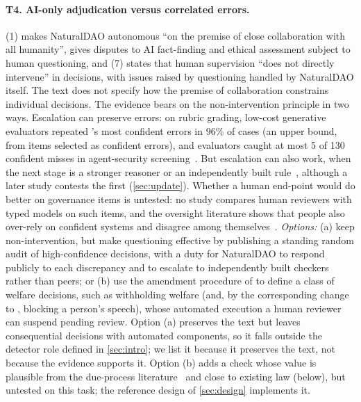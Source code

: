 \paragraph{T4. AI-only adjudication versus correlated errors.}
(1) makes NaturalDAO autonomous ``on the premise of close collaboration with all humanity'',  gives disputes to AI fact-finding and ethical assessment subject to human questioning, and (7) states that human supervision ``does not directly intervene'' in decisions, with issues raised by questioning handled by NaturalDAO itself.
The text does not specify how the premise of collaboration constrains individual decisions.
The evidence bears on the non-intervention principle in two ways.
Escalation can preserve errors: on rubric grading, low-cost generative evaluators repeated \jev{}'s most confident errors in 96\% of cases (an upper bound, from items selected as confident errors), and evaluators caught at most 5 of 130 confident misses in agent-security screening~\cite{arx29769,arx33401}.
But escalation can also work, when the next stage is a stronger reasoner or an independently built rule~\cite{arx26550,arx02048}, although a later study contests the first (\cref{sec:update}).
Whether a human end-point would do better on governance items is untested: no study compares human reviewers with typed models on such items, and the oversight literature shows that people also over-rely on confident systems and disagree among themselves~\cite{parasuraman2010complacency,green2022flaws,bansal2021whole}.
\emph{Options:} (a) keep non-intervention, but make questioning effective by publishing a standing random audit of high-confidence decisions, with a duty for NaturalDAO to respond publicly to each discrepancy and to escalate to independently built checkers rather than peers; or (b) use the amendment procedure of  to define a class of welfare decisions, such as withholding welfare (and, by the corresponding change to , blocking a person's speech), whose automated execution a human reviewer can suspend pending review.
Option (a) preserves the text but leaves consequential decisions with automated components, so it falls outside the detector role defined in \cref{sec:intro}; we list it because it preserves the text, not because the evidence supports it. Option (b) adds a check whose value is plausible from the due-process literature~\cite{citron2008technological} and close to existing law (below), but untested on this task; the reference design of \cref{sec:design} implements it.

